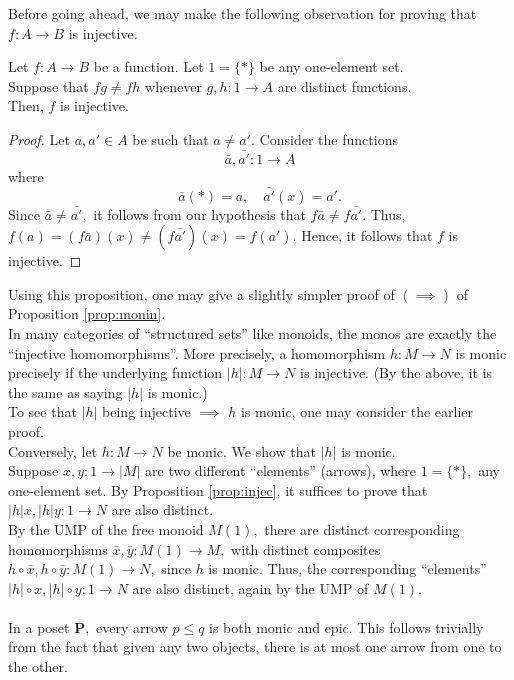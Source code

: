 Before going ahead, we may make the following observation for proving that $f:A\to B$ is injective.
\begin{prop} \label{prop:injec}
	Let $f:A\to B$ be a function. Let $1 = \{*\}$ be any one-element set.\\
	Suppose that $fg \neq fh$ whenever $g, h: 1 \to A$ are distinct functions.\\
	Then, $f$ is injective.
\end{prop}
\begin{proof} 
	Let $a, a' \in A$ be such that $a \neq a'.$ Consider the functions
	\begin{equation*} 
		\bar{a}, \bar{a'} : 1 \to A
	\end{equation*}
	where
	\begin{equation*} 
		\bar{a}(*) = a, \quad \bar{a'}(x) = a'.
	\end{equation*}
	Since $\bar{a} \neq \bar{a'},$ it follows from our hypothesis that $f\bar{a} \neq f\bar{a'}.$ Thus, $f(a) = (f\bar{a})(x) \neq (f\bar{a'})(x) = f(a').$ Hence, it follows that $f$ is injective.
\end{proof}
Using this proposition, one may give a slightly simpler proof of $(\implies)$ of Proposition \ref{prop:monin}.\\
\example{} In many categories of ``structured sets'' like monoids, the monos are exactly the ``injective homomorphisms''. More precisely, a homomorphism $h:M\to N$ is monic precisely if the underlying function $|h|:M\to N$ is injective. (By the above, it is the same as saying $|h|$ is monic.)\\
To see that $|h|$ being injective $\implies$ $h$ is monic, one may consider the earlier proof.\\
Conversely, let $h:M \to N$ be monic. We show that $|h|$ is monic. \\
Suppose $x, y:1 \to |M|$ are two different ``elements'' (arrows), where $1 = \{*\},$ any one-element set. By Proposition \ref{prop:injec}, it suffices to prove that $|h|x, |h|y : 1 \to N$ are also distinct.\\
By the UMP of the free monoid $M(1),$ there are distinct corresponding homomorphisms $\bar{x}, \bar{y}:M(1) \to M,$ with distinct composites $h\circ \bar{x}, h\circ \bar{y}:M(1) \to N,$ since $h$ is monic. Thus, the corresponding ``elements'' $|h|\circ x, |h|\circ y:1 \to N$ are also distinct, again by the UMP of $M(1).$\\\\
\example{} In a poset $\mathbf{P},$ every arrow $p \le q$ is both monic and epic. This follows trivially from the fact that given any two objects, there is at most one arrow from one to the other.\\\\
